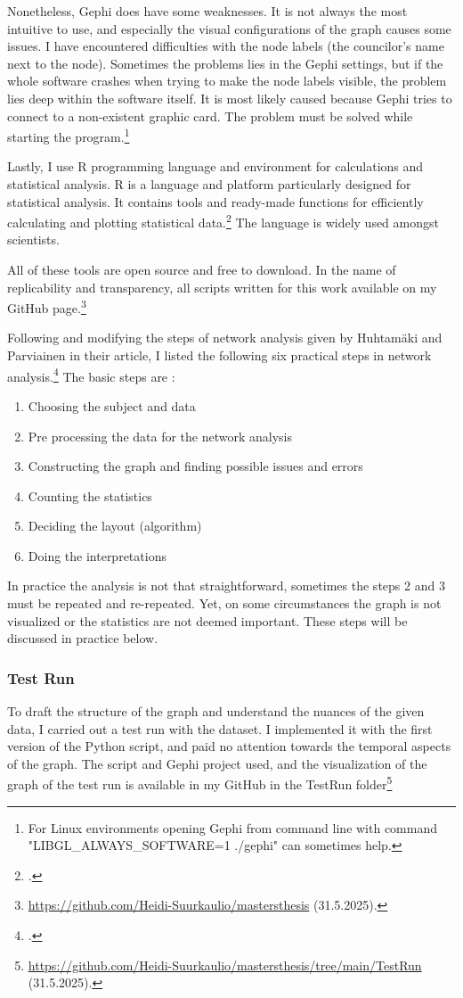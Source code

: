 Nonetheless, Gephi does have some weaknesses. It is not always the most intuitive to use, and especially the visual configurations of the graph causes some issues. I have encountered difficulties with the node labels (the councilor's name next to the node). Sometimes the problems lies in the Gephi settings, but if the whole software crashes when trying to make the node labels visible, the problem lies deep within the software itself. It is most likely caused because Gephi tries to connect to a non-existent graphic card. The problem must be solved while starting the program.\footnote{For Linux environments opening Gephi from command line with command "LIBGL\_ALWAYS\_SOFTWARE=1 ./gephi" can sometimes help.} 

Lastly, I use R programming language and environment for calculations and statistical analysis. R is a language and platform particularly designed for statistical analysis. It contains tools and ready-made functions for efficiently calculating and plotting statistical data.\footcite{R} The language is widely used amongst scientists. 

All of these tools are open source and free to download. In the name of replicability and transparency, all scripts written for this work available on my GitHub page.\footnote{\url{https://github.com/Heidi-Suurkaulio/mastersthesis} (31.5.2025).}

Following and modifying the steps of network analysis given by Huhtamäki and Parviainen in their article, I listed the following six practical steps in network analysis.\footcite[p. 258]{huhtamakiEtAl} 
The basic steps are : \begin{enumerate}
	\item Choosing the subject and data
	\item Pre processing the data for the network analysis
	\item Constructing the graph and finding possible issues and errors 
	\item Counting the statistics
	\item Deciding the layout (algorithm)
	\item Doing the interpretations
\end{enumerate}
In practice the analysis is not that straightforward, sometimes the steps 2 and 3 must be repeated and re-repeated. Yet, on some circumstances the graph is not visualized or the statistics are not deemed important. These steps will be discussed in practice below.

\subsubsection{Test Run}
To draft the structure of the graph and understand the nuances of the given data, I carried out a test run with the dataset. I implemented it with the first version of the Python script, and paid no attention towards the temporal aspects of the graph. The script and Gephi project used, and the visualization of the graph of the test run is available in my GitHub in the TestRun folder\footnote{\url{https://github.com/Heidi-Suurkaulio/mastersthesis/tree/main/TestRun} (31.5.2025).}

